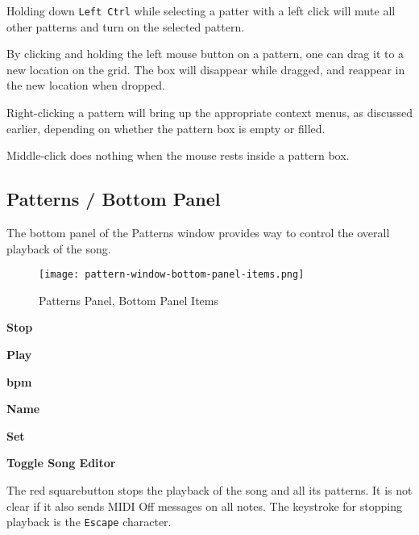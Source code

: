   Holding down \texttt{Left Ctrl} while selecting a patter
   with a left click will mute all other patterns and turn on the selected
   pattern.

   By clicking and holding the left mouse button on a pattern,
   one can drag it to a new location on the grid.  The box
   will disappear while dragged, and reappear in the new location when
   dropped.

   Right-clicking a pattern will bring up the appropriate context menus, as
   discussed earlier, depending on whether the pattern box is empty or
   filled.

   Middle-click does nothing when the mouse rests inside a pattern box.

\subsection{Patterns / Bottom Panel}
\label{subsec:seq24_patterns_panel_bottom}

   The bottom panel of the Patterns window provides way to control the
   overall playback of the song.

\begin{figure}[H]
   \centering 
   \texttt{[image: pattern-window-bottom-panel-items.png]}
   \caption{Patterns Panel, Bottom Panel Items}
   \label{fig:pattern_window_bottom_panel_items}
\end{figure}

   \begin{enumber}
      \item \textbf{Stop}
      \item \textbf{Play}
      \item \textbf{bpm}
      \item \textbf{Name}
      \item \textbf{Set}
      \item \textbf{Toggle Song Editor}
   \end{enumber}

   \setcounter{ItemCounter}{0}      %

   The red squarebutton stops the playback of the song and all its patterns.
   It is not clear if it also sends MIDI Off messages on all notes.
   The keystroke for stopping playback is the \texttt{Escape} character.

